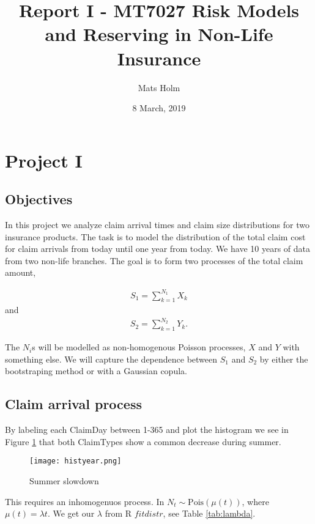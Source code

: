 \documentclass[11pt]{article}
\title{Report I - MT7027 Risk Models and Reserving in Non-Life Insurance}
\author{Mats Holm}
\date{8 March, 2019}                                           %
\begin{document}
\maketitle
\section*{Project I}
\subsection*{Objectives}

In this project we analyze claim
arrival times and claim size distributions for two insurance products.
The task is to model
the distribution of the total claim cost for claim arrivals from today until one year from
today. We have 10 years of data from two non-life branches. The goal is to form two processes of the total claim amount,

\begin{align} \label{eq:sum1}
	S_1 = \sum_{k=1}^{N_1}  X_k 
\end{align}
and
\begin{align} \label{eq:sum2}
	 S_2 = \sum_{k=1}^{N_2} Y_k.
\end{align}

The $N_i$s will be modelled as non-homogenous Poisson processes, $X$ and $Y$ with something else. We will capture the dependence between
$S_1$ and $S_2$ by  either the
bootstraping method or with a Gaussian copula.


\subsection*{Claim arrival process}
By labeling each ClaimDay between 1-365 and plot the histogram we see in Figure \ref{fig:samplefig1} that both ClaimTypes show a common decrease during summer.
 \begin{figure}[h]
 \center
  \texttt{[image: histyear.png]}
  \caption{Summer slowdown}
  \label{fig:samplefig1}
\end{figure}

This requires an inhomogenuos process. In $N_t  \sim  \mathrm{Pois}(\mu(t))$, where  $\mu(t) = \lambda t$. We get our $\lambda$ from R $fitdistr$, see Table \ref{tab:lambda}.
\end{document}
